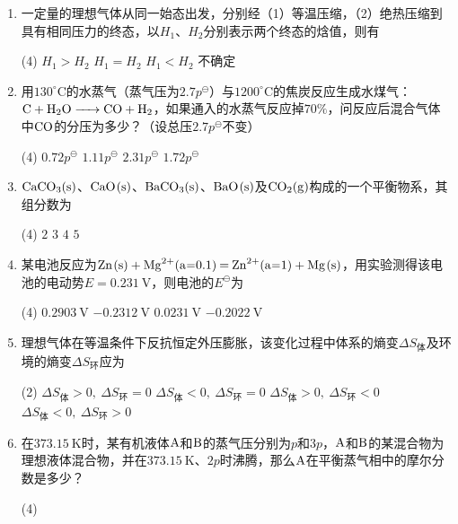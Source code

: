 \begin{enumerate}[label=\arabic*., itemsep=1.5ex]
    \item 一定量的理想气体从同一始态出发，分别经（1）等温压缩，（2）绝热压缩到具有相同压力的终态，以$H_1$、$H_2$分别表示两个终态的焓值，则有
    \begin{tasks}(4)
        \task $H_1 > H_2$
        \task $H_1 = H_2$
        \task $H_1 < H_2$
        \task 不确定
    \end{tasks}
    \item 用$130^\circ\mathrm{C}$的水蒸气（蒸气压为$2.7p^\ominus$）与$1200^\circ\mathrm{C}$的焦炭反应生成水煤气：$\ce{C + H2O -> CO + H2}$，如果通入的水蒸气反应掉$70\%$，问反应后混合气体中$\ce{CO}$的分压为多少？（设总压$2.7p^\ominus$不变）
    \begin{tasks}(4)
        \task $0.72p^\ominus$
        \task $1.11p^\ominus$
        \task $2.31p^\ominus$
        \task $1.72p^\ominus$
    \end{tasks}
    \item $\ce{CaCO3(s)}$、$\ce{CaO(s)}$、$\ce{BaCO3(s)}$、$\ce{BaO(s)}$及$\ce{CO2(g)}$构成的一个平衡物系，其组分数为
    \begin{tasks}(4)
        \task $2$
        \task $3$
        \task $4$
        \task $5$
    \end{tasks}
    \item 某电池反应为$\ce{Zn(s) + Mg^{2+}(a=0.1) = Zn^{2+}(a=1) + Mg(s)}$，用实验测得该电池的电动势$E=0.231\ \mathrm{V}$，则电池的$E^\ominus$为
    \begin{tasks}(4)
        \task $0.2903\ \mathrm{V}$
        \task $-0.2312\ \mathrm{V}$
        \task $0.0231\ \mathrm{V}$
        \task $-0.2022\ \mathrm{V}$
    \end{tasks}
    \item 理想气体在等温条件下反抗恒定外压膨胀，该变化过程中体系的熵变$\Delta S_\text{体}$及环境的熵变$\Delta S_\text{环}$应为
    \begin{tasks}(2)
        \task $\Delta S_\text{体}>0,\ \Delta S_\text{环}=0$
        \task $\Delta S_\text{体}<0,\ \Delta S_\text{环}=0$
        \task $\Delta S_\text{体}>0,\ \Delta S_\text{环}<0$
        \task $\Delta S_\text{体}<0,\ \Delta S_\text{环}>0$
    \end{tasks}
    \item 在$373.15\ \mathrm{K}$时，某有机液体$\ce{A}$和$\ce{B}$的蒸气压分别为$p$和$3p$，$\ce{A}$和$\ce{B}$的某混合物为理想液体混合物，并在$373.15\ \mathrm{K}$、$2p$时沸腾，那么$\ce{A}$在平衡蒸气相中的摩尔分数是多少？
    \begin{tasks}(4)

\end{tasks}
\end{enumerate}
